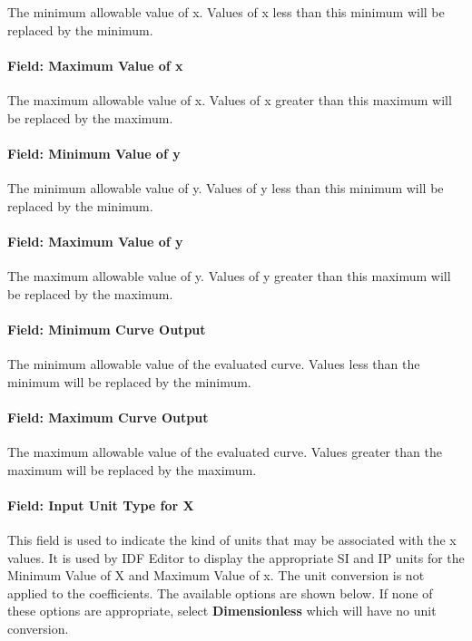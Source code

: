 The minimum allowable value of x. Values of x less than this minimum will be replaced by the minimum.

\paragraph{Field: Maximum Value of x}\label{field-maximum-value-of-x-7}

The maximum allowable value of x. Values of x greater than this maximum will be replaced by the maximum.

\paragraph{Field: Minimum Value of y}\label{field-minimum-value-of-y-1}

The minimum allowable value of y. Values of y less than this minimum will be replaced by the minimum.

\paragraph{Field: Maximum Value of y}\label{field-maximum-value-of-y-1}

The maximum allowable value of y. Values of y greater than this maximum will be replaced by the maximum.

\paragraph{Field: Minimum Curve Output}\label{field-minimum-curve-output-5}

The minimum allowable value of the evaluated curve. Values less than the minimum will be replaced by the minimum.

\paragraph{Field: Maximum Curve Output}\label{field-maximum-curve-output-4}

The maximum allowable value of the evaluated curve. Values greater than the maximum will be replaced by the maximum.

\paragraph{Field: Input Unit Type for X}\label{field-input-unit-type-for-x-6}

This field is used to indicate the kind of units that may be associated with the x values. It is used by IDF Editor to display the appropriate SI and IP units for the Minimum Value of X and Maximum Value of x. The unit conversion is not applied to the coefficients. The available options are shown below. If none of these options are appropriate, select \textbf{Dimensionless} which will have no unit conversion.

